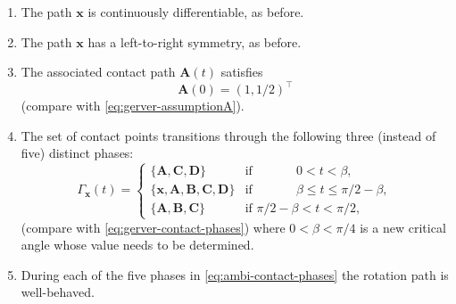 \documentclass[11pt]{article}
\newcommand{\contact}{\Gamma}
\begin{document}
\begin{enumerate}

\item The path $\mathbf{x}$ is continuously differentiable, as before.
\item The path $\mathbf{x}$ has a left-to-right symmetry, as before.
\item The associated contact path $\mathbf{A}(t)$ satisfies 
\begin{equation} \label{eq:ambi-assumptionA}
\mathbf{A}(0)=(1,1/2)^\top
\end{equation}
(compare with \eqref{eq:gerver-assumptionA}).
\item The set of contact points transitions through the following three (instead of five) distinct phases:
\begin{equation} \label{eq:ambi-contact-phases}
\contact_{\mathbf{x}}(t) = \begin{cases}
\{ \mathbf{A}, \mathbf{C}, \mathbf{D} \} & \textrm{if }\phantom{\pi/2-\ \,}0< t< \beta, \\
\{ \mathbf{x}, \mathbf{A}, \mathbf{B}, \mathbf{C}, \mathbf{D} \}& \textrm{if }\phantom{\pi/2-\ \,}\beta \le t \le \pi/2-\beta, \\
\{ \mathbf{A}, \mathbf{B}, \mathbf{C} \} & \textrm{if } \pi/2-\beta < t < \pi/2,
\end{cases}
\end{equation}
(compare with \eqref{eq:gerver-contact-phases}) where $0<\beta<\pi/4$ is a new critical angle whose value needs to be determined. 

\item During each of the five phases in \eqref{eq:ambi-contact-phases} the rotation path is well-behaved.

\end{enumerate}
\end{document}
